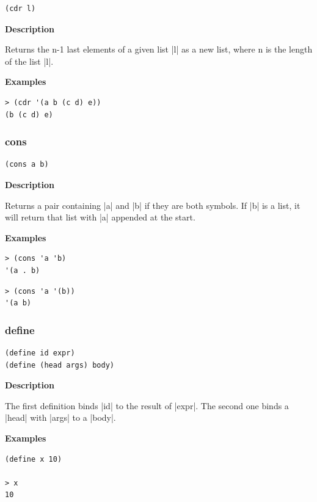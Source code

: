 \documentclass[a4paper]{article}
\begin{document}
\begin{lstlisting}[frame=none]
(cdr l)
\end{lstlisting}

\textbf{Description}

Returns the n-1 last elements of a given list |l| as a new list, where n is the length of the list |l|.

\textbf{Examples}

\begin{lstlisting}
> (cdr '(a b (c d) e))
(b (c d) e)
\end{lstlisting}

\subsubsection{cons}

\begin{lstlisting}[frame=none]
(cons a b)
\end{lstlisting}

\textbf{Description}

Returns a pair containing |a| and |b| if they are both symbols. If |b| is a list, it will return that list with |a| appended at the start.

\textbf{Examples}

\begin{lstlisting}
> (cons 'a 'b)
'(a . b)
\end{lstlisting}

\begin{lstlisting}
> (cons 'a '(b))
'(a b)
\end{lstlisting}

\subsubsection{define}

\begin{lstlisting}[frame=none]
(define id expr)
(define (head args) body)
\end{lstlisting}

\textbf{Description}

The first definition binds |id| to the result of |expr|. The second one binds a |head| with |args| to a |body|.

\textbf{Examples}

\begin{lstlisting}
(define x 10)

> x
10
\end{lstlisting}
\end{document}
